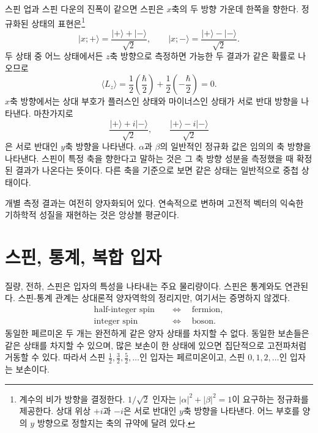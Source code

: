 스핀 업과 스핀 다운의 진폭이 같으면 스핀은 \(x\)축의 두 방향 가운데 한쪽을 향한다. 정규화된 상태의 표현은\footnote{계수의 비가 방향을 결정한다. \(1/\sqrt2\) 인자는 \( |\alpha|^2+|\beta|^2=1\)이 요구하는 정규화를 제공한다. 상대 위상 \(+i\)과 \(-i\)은 서로 반대인 \(y\)축 방향을 나타낸다. 어느 부호를 양의 \(y\) 방향으로 정할지는 축의 규약에 달려 있다.}\begin{equation}
\lvert x;+\rangle
=
\frac{\lvert+\rangle+\lvert-\rangle}{\sqrt2},
\qquad
\lvert x;-\rangle
=
\frac{\lvert+\rangle-\lvert-\rangle}{\sqrt2}.
\end{equation}두 상태 중 어느 상태에서든 \(z\)축 방향으로 측정하면 가능한 두 결과가 같은 확률로 나오므로\begin{equation}
\langle L_z\rangle
=
\frac12\left(\frac{\hbar}{2}\right)
+
\frac12\left(-\frac{\hbar}{2}\right)
=0.
\end{equation}\(x\)축 방향에서는 상대 부호가 플러스인 상태와 마이너스인 상태가 서로 반대 방향을 나타낸다. 마찬가지로 \begin{equation}
\frac{\lvert+\rangle+i\lvert-\rangle}{\sqrt2},
\qquad
\frac{\lvert+\rangle-i\lvert-\rangle}{\sqrt2}
\end{equation}은 서로 반대인 \(y\)축 방향을 나타낸다. \(\alpha\)과 \(\beta\)의 일반적인 정규화 값은 임의의 축 방향을 나타낸다. 스핀이 특정 축을 향한다고 말하는 것은 그 축 방향 성분을 측정했을 때 확정된 결과가 나온다는 뜻이다. 다른 축을 기준으로 보면 같은 상태는 일반적으로 중첩 상태이다.

개별 측정 결과는 여전히 양자화되어 있다. 연속적으로 변하며 고전적 벡터의 익숙한 기하학적 성질을 재현하는 것은 앙상블 평균이다.

\section{스핀, 통계, 복합 입자}

질량, 전하, 스핀은 입자의 특성을 나타내는 주요 물리량이다. 스핀은 통계와도 연관된다. 스핀-통계 관계는 상대론적 양자역학의 정리지만, 여기서는 증명하지 않겠다.
\begin{equation}
\begin{aligned}
\text{half-integer spin} &\quad\Longleftrightarrow\quad \text{fermion},\\
\text{integer spin} &\quad\Longleftrightarrow\quad \text{boson}.
\end{aligned}
\end{equation}
동일한 페르미온 두 개는 완전하게 같은 양자 상태를 차지할 수 없다. 동일한 보손들은 같은 상태를 차지할 수 있으며, 많은 보손이 한 상태에 있으면 집단적으로 고전파처럼 거동할 수 있다. 따라서 스핀 \(\tfrac12,\tfrac32,\tfrac52,\ldots\)인 입자는 페르미온이고, 스핀 \(0,1,2,\ldots\)인 입자는 보손이다.

